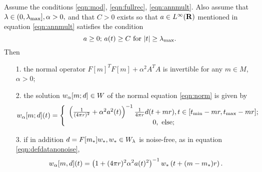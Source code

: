 \begin{proposition}
  \label{thm:norminvexp}
  Assume the conditions \ref{eqn:mod}, \ref{eqn:fullrec},
  \ref{eqn:annmult}. Also assume that $\lambda \in (0,\lambda_{\rm
    max}], \alpha > 0,$ and that  $C>0$ exists so that $a \in L^{\infty}({\bf R})$
  mentioned in equation \ref{eqn:annmult} satisfies the condition
\begin{equation}
    \label{eqn:abnd} 
    a \ge 0; \, a(t) \ge C\mbox{ for }|t| \ge \lambda_{\rm max}.
  \end{equation}
  Then
  \begin{itemize}
  \item[1. ]the normal operator $F[m]^TF[m] + \alpha^2A^TA$ is
    invertible for any $m \in M$, $\alpha > 0$;
  \item[2. ]the solution $w_{\alpha}[m;d]\in W$ of the normal equation
    \ref{eqn:norm} is given by
    \begin{equation}
      \label{eqn:normsol}
      w_{\alpha}[m;d](t) = \left\{
        \begin{array}{c}
          \left(\frac{1}{(4\pi r)^2} + \alpha^2
          a^2(t)\right)^{-1}\frac{1}{4 \pi r}d(t+mr), t \in [t_{\rm
          min}-mr, t_{\rm max}-mr];\\
          0, \mbox{ else;}
        \end{array}
      \right.
    \end{equation}
  \item[3. ]if in addition $d=F[m_*]w_*, w_* \in W_{\lambda}$ is noise-free, as in equation
    \ref{eqn:defdatanonoise},
    \begin{equation}
      \label{eqn:solnonoise}
      w_{\alpha}[m,d](t)= \left(1+ (4\pi r)^2\alpha^2 a(t)^2\right)^{-1}w_*\left(t+(m-m_*)r\right).
    \end{equation}
  \end{itemize}
\end{proposition}

